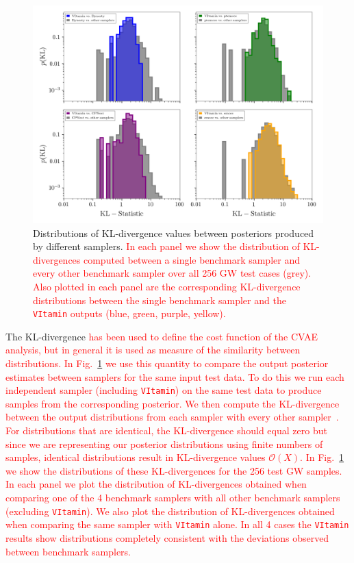 \documentclass[%
showpacs,
nofootinbib,
 amsmath,amssymb,
 aps,
 twocolumn,
 prl,
 reprint,
floatfix,
]{revtex4-1}
\newcommand{\new}[1]{\textcolor{red}{#1}}
\begin{document}
%
\begin{figure}
    \includegraphics[width=\textwidth]{hist-kl.png}
    \caption{\label{fig:kl_results} Distributions of \ac{KL}-divergence values
between posteriors produced by different samplers. \new{In each panel we show the
distribution of \ac{KL}-divergences computed between a single benchmark sampler
and every other benchmark sampler over all 256 \ac{GW} test cases (grey). Also
plotted in each panel are the corresponding \ac{KL}-divergence distributions
between the single benchmark sampler and the \texttt{VItamin} outputs (blue,
green, purple, yellow).}}

\end{figure}
%

%
%
The \ac{KL}-divergence \new{has been used to define the cost function of the
\ac{CVAE} analysis, but in general it is used as measure of the similarity
between distributions. In Fig.~\ref{fig:kl_results} we use this quantity to
compare the output posterior estimates between samplers for the same input test
data. To do this we run each independent sampler (including \texttt{VItamin})
on the same test data to produce samples from the corresponding posterior. We
then compute the \ac{KL}-divergence between the output distributions from each
sampler with every other sampler~\cite{4839047}.  For distributions that are
identical, the \ac{KL}-divergence {should} equal zero but since we are
representing our posterior distributions using finite numbers of samples,
identical distributions result in \ac{KL}-divergence values $\mathcal{O}(X)$.
In Fig.~\ref{fig:kl_results} we show the distributions of these
\ac{KL}-divergences for the 256 test \ac{GW} samples. In each panel we plot the
distribution of \ac{KL}-divergences obtained when comparing one of the 4
benchmark samplers with all other benchmark samplers (excluding
\texttt{VItamin}). We also plot the distribution of \ac{KL}-divergences
obtained when comparing the same sampler with \texttt{VItamin} alone. In all 4
cases the \texttt{VItamin} results show distributions completely consistent
with the deviations observed between benchmark samplers.}  


\end{document}
